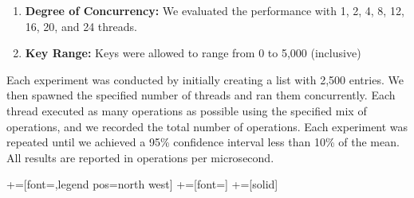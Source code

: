 \documentclass{llncs}
\begin{document}
{\begin{enumerate}
\item{\bf Degree of Concurrency:} We evaluated the performance with 1, 2, 4,
8, 12, 16, 20, and 24 threads.
\item{\bf Key Range:} Keys were allowed to range from 0 to 5,000 (inclusive)
\end{enumerate}

Each experiment was conducted by initially creating a list with 2,500 entries.  
We then spawned the specified number of threads and ran them concurrently.
Each thread executed as many operations as possible using
the specified mix of operations, and we recorded the total number of operations.
Each experiment was repeated until we achieved a 95\% confidence interval
less than 10\% of the mean.
All results are reported in operations per microsecond.

+=[font=\tiny,legend pos=north west]
+=[font=\tiny]
+=[solid]
\begin{figure}
\centering
\begin{tikzpicture}



\end{tikzpicture}
\end{figure}}
\end{document}
